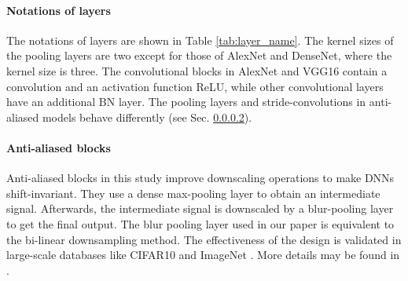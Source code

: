\documentclass{article}
\begin{document}
\paragraph{Notations of layers}The notations of layers are shown in Table \ref{tab:layer_name}. The kernel sizes of the pooling layers are two except for those of AlexNet and DenseNet, where the kernel size is three. The convolutional blocks in AlexNet and VGG16 contain a convolution and an activation function ReLU, while other convolutional layers have an additional BN layer. The pooling layers and stride-convolutions in anti-aliased models behave differently (see Sec. \ref{subsec:anti_ali}).
\paragraph{Anti-aliased blocks} \label{subsec:anti_ali}
Anti-aliased blocks in this study improve downscaling operations to make DNNs shift-invariant. They use a dense max-pooling layer to obtain an intermediate signal. Afterwards, the intermediate signal is downscaled by a blur-pooling layer to get the final output. The blur pooling layer used in our paper is equivalent to the bi-linear downsampling method. The effectiveness of the design is validated in large-scale databases like CIFAR10 and ImageNet \cite{cifa_data,ImageNet}. More details may be found in \cite{make_conv_shift_inva}.
\end{document}
